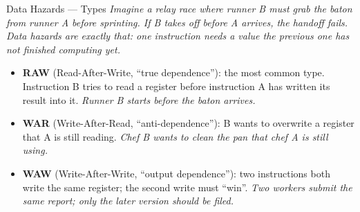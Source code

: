\documentclass{beamer}
\begin{document}
\begin{frame}{Data Hazards --- Types}
  \textit{Imagine a relay race where runner B must grab the baton from runner A
  before sprinting. If B takes off before A arrives, the handoff fails.
  Data hazards are exactly that: one instruction needs a value the previous
  one has not finished computing yet.}

  \medskip
  \begin{itemize}
    \item \textbf{RAW} (Read-After-Write, ``true dependence''): the most common
          type. Instruction B tries to read a register before instruction A has
          written its result into it. \textit{Runner B starts before the baton
          arrives.}
    \item \textbf{WAR} (Write-After-Read, ``anti-dependence''): B wants to
          overwrite a register that A is still reading. \textit{Chef B wants to
          clean the pan that chef A is still using.}
    \item \textbf{WAW} (Write-After-Write, ``output dependence''): two
          instructions both write the same register; the second write must
          ``win''. \textit{Two workers submit the same report; only the later
          version should be filed.}
  \end{itemize}
\end{frame}
\end{document}
